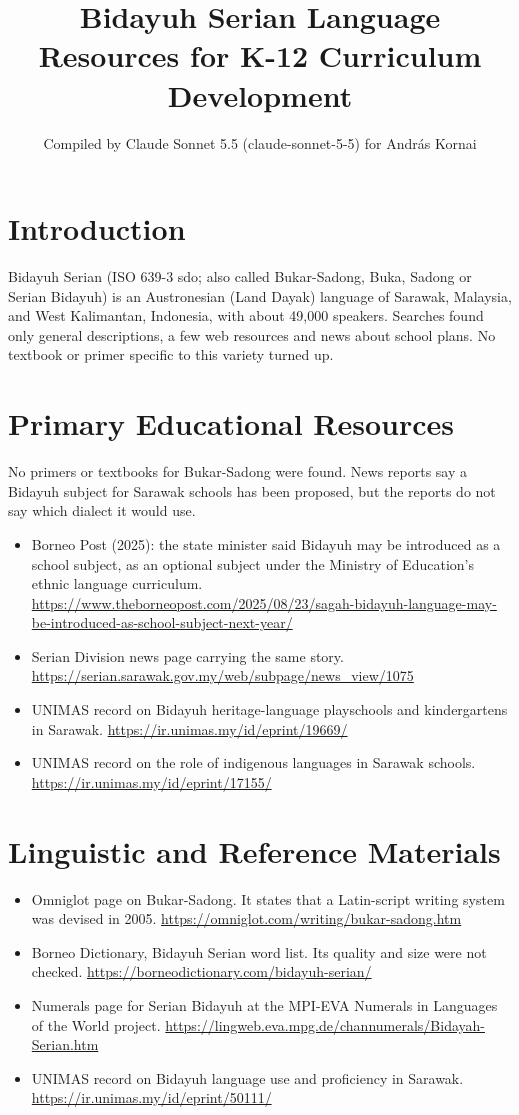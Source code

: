 \documentclass[12pt]{article}
\title{Bidayuh Serian Language Resources for K-12 Curriculum Development}
\author{Compiled by Claude Sonnet 5.5 (claude-sonnet-5-5) for Andr\'as Kornai}
\date{}
\begin{document}
\maketitle

\section{Introduction}
Bidayuh Serian (ISO 639-3 sdo; also called Bukar-Sadong, Buka, Sadong or Serian Bidayuh) is an Austronesian (Land Dayak) language of Sarawak, Malaysia, and West Kalimantan, Indonesia, with about 49,000 speakers. Searches found only general descriptions, a few web resources and news about school plans. No textbook or primer specific to this variety turned up.

\section{Primary Educational Resources}
No primers or textbooks for Bukar-Sadong were found. News reports say a Bidayuh subject for Sarawak schools has been proposed, but the reports do not say which dialect it would use.
\begin{itemize}
\item Borneo Post (2025): the state minister said Bidayuh may be introduced as a school subject, as an optional subject under the Ministry of Education's ethnic language curriculum. \url{https://www.theborneopost.com/2025/08/23/sagah-bidayuh-language-may-be-introduced-as-school-subject-next-year/}
\item Serian Division news page carrying the same story. \url{https://serian.sarawak.gov.my/web/subpage/news_view/1075}
\item UNIMAS record on Bidayuh heritage-language playschools and kindergartens in Sarawak. \url{https://ir.unimas.my/id/eprint/19669/}
\item UNIMAS record on the role of indigenous languages in Sarawak schools. \url{https://ir.unimas.my/id/eprint/17155/}
\end{itemize}

\section{Linguistic and Reference Materials}
\begin{itemize}
\item Omniglot page on Bukar-Sadong. It states that a Latin-script writing system was devised in 2005. \url{https://omniglot.com/writing/bukar-sadong.htm}
\item Borneo Dictionary, Bidayuh Serian word list. Its quality and size were not checked. \url{https://borneodictionary.com/bidayuh-serian/}
\item Numerals page for Serian Bidayuh at the MPI-EVA Numerals in Languages of the World project. \url{https://lingweb.eva.mpg.de/channumerals/Bidayah-Serian.htm}
\item UNIMAS record on Bidayuh language use and proficiency in Sarawak. \url{https://ir.unimas.my/id/eprint/50111/}
\end{itemize}
\end{document}
